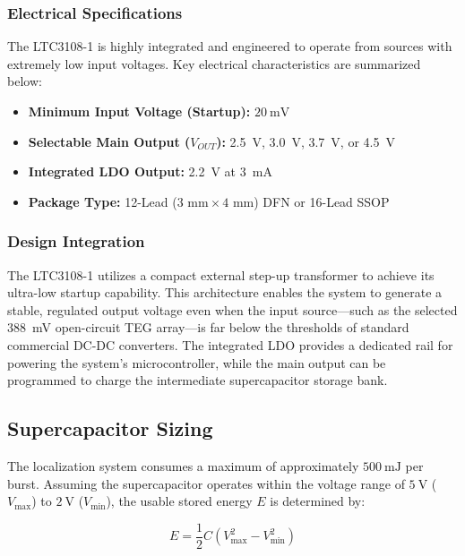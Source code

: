 \documentclass[paper=a4]{article}
\begin{document}
\subsubsection*{Electrical Specifications}
The LTC3108-1 is highly integrated and engineered to operate from sources with extremely low input voltages. Key electrical characteristics are summarized below:

\begin{itemize}
    \item \textbf{Minimum Input Voltage (Startup):} $\SI{20}{\milli\volt}$
    \item \textbf{Selectable Main Output ($V_{OUT}$):} \SI{2.5}{\volt}, \SI{3.0}{\volt}, \SI{3.7}{\volt}, or \SI{4.5}{\volt}
    \item \textbf{Integrated LDO Output:} \SI{2.2}{\volt} at \SI{3}{\milli\ampere}
    \item \textbf{Package Type:} 12-Lead ($3\text{ mm} \times 4\text{ mm}$) DFN or 16-Lead SSOP
\end{itemize}

\subsubsection*{Design Integration}
The LTC3108-1 utilizes a compact external step-up transformer to achieve its ultra-low startup capability. This architecture enables the system to generate a stable, regulated output voltage even when the input source—such as the selected \SI{388}{\milli\volt} open-circuit TEG array—is far below the thresholds of standard commercial DC-DC converters. The integrated LDO provides a dedicated rail for powering the system's microcontroller, while the main output can be programmed to charge the intermediate supercapacitor storage bank.

\subsection{Supercapacitor Sizing}

The localization system consumes a maximum of approximately $\SI{500}{\milli\joule}$ per burst. Assuming the supercapacitor operates within the voltage range of $\SI{5}{\volt}$ ($V_{\max}$) to $\SI{2}{\volt}$ ($V_{\min}$), the usable stored energy $E$ is determined by:

\begin{equation}
    E = \frac{1}{2} C \left(V_{\max}^2 - V_{\min}^2\right)
\end{equation}
\end{document}
